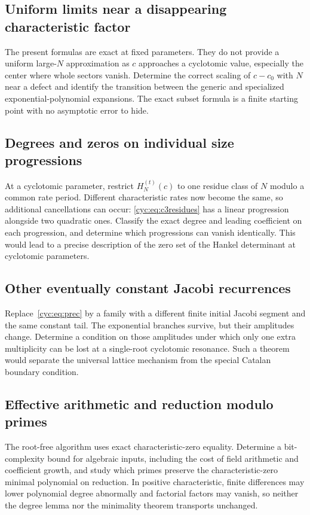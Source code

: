 \documentclass[11pt,a4paper]{article}
\numberwithin{equation}{section}
\theoremstyle{definition}
\theoremstyle{remark}
\begin{document}
\subsection{Uniform limits near a disappearing characteristic factor}\label{ic:x:cycuniform}
The present formulas are exact at fixed parameters.  They do not
provide a uniform large-$N$ approximation as $c$ approaches a
cyclotomic value, especially the center where whole sectors vanish.
Determine the correct scaling of $c-c_0$ with $N$ near a defect and
identify the transition between the generic and specialized
exponential-polynomial expansions.  The exact subset formula is a
finite starting point with no asymptotic error to hide.

\subsection{Degrees and zeros on individual size progressions}
At a cyclotomic parameter, restrict $H_N^{(t)}(c)$ to one residue
class of $N$ modulo a common rate period.  Different characteristic
rates now become the same, so additional cancellations can occur:
\eqref{cyc:eq:c3residues} has a linear progression alongside two quadratic
ones.  Classify the exact degree and leading coefficient on each
progression, and determine which progressions can vanish identically.
This would lead to a precise description of the zero set of the
Hankel determinant at cyclotomic parameters.

\subsection{Other eventually constant Jacobi recurrences}
Replace~\eqref{cyc:eq:prec} by a family with a different finite initial
Jacobi segment and the same constant tail.  The exponential branches
survive, but their amplitudes change.  Determine a condition on those
amplitudes under which only one extra multiplicity can be lost at a
single-root cyclotomic resonance.  Such a theorem would separate the
universal lattice mechanism from the special Catalan boundary
condition.

\subsection{Effective arithmetic and reduction modulo primes}
The root-free algorithm uses exact characteristic-zero equality.
Determine a bit-complexity bound for algebraic inputs, including the
cost of field arithmetic and coefficient growth, and study which
primes preserve the characteristic-zero minimal polynomial on
reduction.  In positive characteristic, finite differences may lower
polynomial degree abnormally and factorial factors may vanish, so
neither the degree lemma nor the minimality theorem transports
unchanged.
\end{document}

